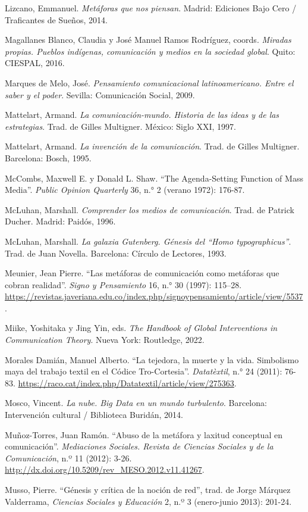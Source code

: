\documentclass{tufte-handout}
\begin{document}
\begin{hangparas}{.25in}{1}
Lizcano, Emmanuel. \emph{Metáforas que nos piensan}. Madrid: Ediciones
Bajo Cero / Traficantes de Sueños, 2014.

Magallanes Blanco, Claudia y José Manuel Ramos Rodríguez, coords.
\emph{Miradas propias. Pueblos indígenas, comunicación y medios en la
sociedad global}. Quito: CIESPAL, 2016.

Marques de Melo, José. \emph{Pensamiento comunicacional latinoamericano.
Entre el saber y el poder}. Sevilla: Comunicación Social, 2009.

Mattelart, Armand. \emph{La comunicación-mundo. Historia de las ideas y
de las estrategias}. Trad. de Gilles Multigner. México: Siglo XXI, 1997.

Mattelart, Armand. \emph{La invención de la comunicación}. Trad. de
Gilles Multigner. Barcelona: Bosch, 1995.

McCombs, Maxwell E. y Donald L. Shaw. ``The Agenda-Setting Function of
Mass Media''. \emph{Public Opinion Quarterly} 36, n.° 2 (verano 1972):
176-87.

McLuhan, Marshall. \emph{Comprender los medios de comunicación}. Trad.
de Patrick Ducher. Madrid: Paidós, 1996.

McLuhan, Marshall. \emph{La galaxia Gutenberg. Génesis del ``Homo
typographicus''}. Trad. de Juan Novella. Barcelona: Círculo de Lectores,
1993.

Meunier, Jean Pierre. ``Las metáforas de comunicación como metáforas que
cobran realidad''. \emph{Signo y Pensamiento} 16, n.° 30 (1997):
115--28.
\url{https://revistas.javeriana.edu.co/index.php/signoypensamiento/article/view/5537}.

Miike, Yoshitaka y Jing Yin, eds. \emph{The Handbook of Global
Interventions in Communication Theory}. Nueva York: Routledge, 2022.

Morales Damián, Manuel Alberto. ``La tejedora, la muerte y la vida.
Simbolismo maya del trabajo textil en el Códice Tro-Cortesia''.
\emph{Datatèxtil}, n.° 24 (2011): 76-83.
\url{https://raco.cat/index.php/Datatextil/article/view/275363}.

Mosco, Vincent. \emph{La nube. Big Data en un mundo turbulento}.
Barcelona: Intervención cultural / Biblioteca Buridán, 2014.

Muñoz-Torres, Juan Ramón. ``Abuso de la metáfora y laxitud conceptual en
comunicación''. \emph{Mediaciones Sociales. Revista de Ciencias Sociales
y de la Comunicación}, n.º 11 (2012): 3-26.
\url{http://dx.doi.org/10.5209/rev_MESO.2012.v11.41267}.

Musso, Pierre. ``Génesis y crítica de la noción de red'', trad. de Jorge
Márquez Valderrama, \emph{Ciencias Sociales y Educación} 2, n.º 3
(enero-junio 2013): 201-24.


\end{hangparas}
\end{document}
